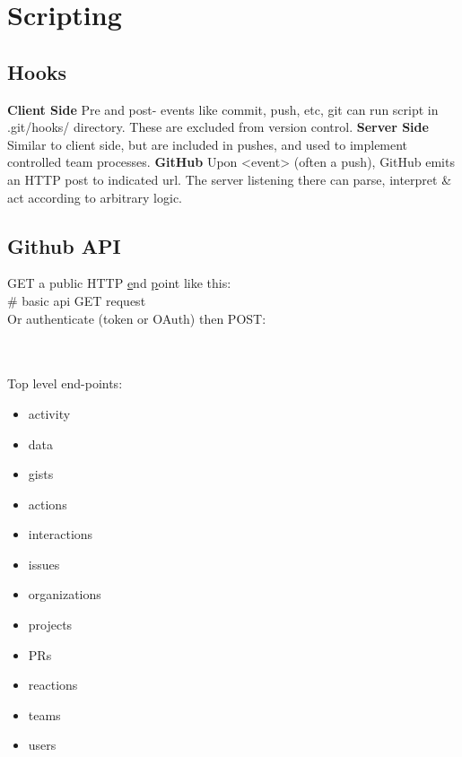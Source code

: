 \section{Scripting}

\subsection*{Hooks}
\textbf{Client Side} Pre and post- events like commit, push, etc, git can run script in .git/hooks/ directory.  These are excluded from version control.
\textbf{Server Side} Similar to client side, but are included in pushes, and used to implement controlled team processes.
\textbf{GitHub} Upon <event> (often a push), GitHub emits an HTTP post to indicated url.  The server listening there can parse, interpret \& act according to arbitrary logic. 


\subsection*{Github API}
GET a public HTTP \underline{e}nd \underline{p}oint like this:\\
 \# basic api GET request \\
Or authenticate (token or OAuth) then POST: \\
\\
\phantom{xxxx} \\
\phantom{xxxx}  

Top level end-points:
\begin{multicols}{2}
\scriptsize
\begin{itemize}
    \item activity
    \item data
    \item gists
    \item actions
    \item interactions
    \item issues
    \item organizations
    \item projects
    \item PRs
    \item reactions
    \item teams
    \item users
\end{itemize}
\end{multicols}
\ \\